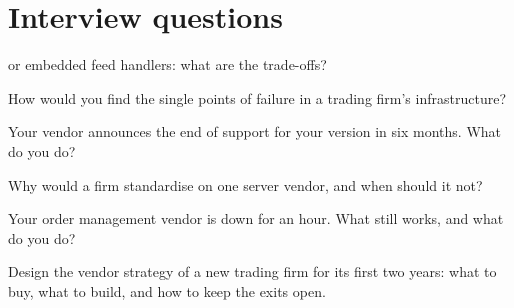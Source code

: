 \section{Interview questions}

\begin{interviewq}\label{iq:nw:the-vendor-map:1}
 or embedded feed handlers: what are the trade-offs?
\end{interviewq}

\begin{interviewq}\label{iq:nw:the-vendor-map:2}
How would you find the single points of failure in a trading firm's infrastructure?
\end{interviewq}

\begin{interviewq}\label{iq:nw:the-vendor-map:3}
Your  vendor announces the end of support for your version in six months. What do you do?
\end{interviewq}

\begin{interviewq}\label{iq:nw:the-vendor-map:4}
Why would a firm standardise on one server vendor, and when should it not?
\end{interviewq}

\begin{interviewq}\label{iq:nw:the-vendor-map:5}
Your order management vendor is down for an hour. What still works, and what do you do?
\end{interviewq}

\begin{interviewq}\label{iq:nw:the-vendor-map:6}
Design the vendor strategy of a new trading firm for its first two years: what to buy, what to build, and how to keep the exits open.
\end{interviewq}
